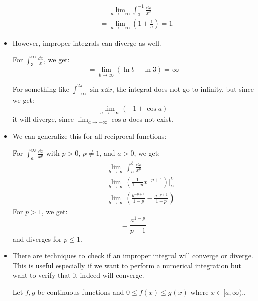 \begin{itemize}
\begin{example}
\begin{align}
            &= \lim_{a\to -\infty} \int_a^{-1} \frac{\dd{x}}{x^2} \\ 
            &= \lim_{a\to -\infty}\left(1+\frac{1}{a}\right) = 1
        \end{align}
    \end{example}
    \item However, improper integrals can diverge as well.
    \begin{example}
        For $\int_3^\infty \frac{\dd{x}}{x}$, we get:
        \begin{equation}
            =\lim_{b\to\infty} \left(\ln b - \ln 3\right) = \infty
        \end{equation}
    \end{example}
    \begin{example}
        For something like $\int_{-\infty}^{2\pi} \sin x \dd{x}$, the integral does not go to infinity, but since we get:
        \begin{equation}
            \lim_{a\to -\infty}\left(-1+\cos a\right)
        \end{equation}
        it will diverge, since $\lim_{a\to-\infty} \cos a$ does not exist.
    \end{example}
    \item We can generalize this for all reciprocal functions:
    \begin{idea}
        For $\int_a^\infty \frac{\dd{x}}{x^p}$ with $p > 0$, $p \neq 1$, and $a>0$, we get:
        \begin{align}
            &= \lim_{b\to\infty} \int_a^b \frac{\dd{x}}{x^p} \\ 
            &= \lim_{b\to\infty} \left(\frac{1}{1-p}x^{-p+1}\right)\Bigg|^b_a \\ 
            &= \lim_{b\to \infty} \left(\frac{b^{-p+1}}{1-p} - \frac{a^{-p+1}}{1-p}\right)
        \end{align}
        For $p>1$, we get:
        \begin{equation}
            = \frac{a^{1-p}}{p-1}
        \end{equation}
        and diverges for $p \le 1$.
    \end{idea}
    \item There are techniques to check if an improper integral will converge or diverge. This is useful especially if we want to perform a numerical integration but want to verify that it indeed will converge.
    \begin{theorem}
        Let $f,g$ be continuous functions and $0 \le f(x) \le g(x)$ where $x\in [a,\infty)$,. 

\end{theorem}
\end{itemize}
